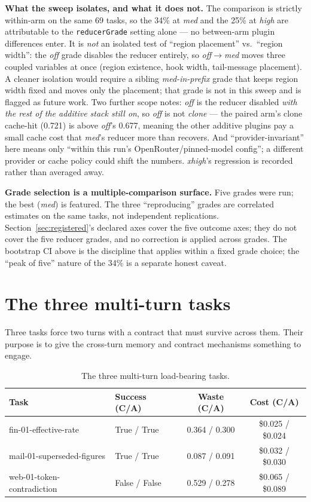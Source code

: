 \documentclass[11pt]{article}
\begin{document}
\textbf{What the sweep isolates, and what it does not.} The comparison is strictly within-arm on the same 69 tasks, so the 34\% at \emph{med} and the 25\% at \emph{high} are attributable to the \texttt{reducerGrade} setting alone --- no between-arm plugin differences enter. It is \emph{not} an isolated test of ``region placement'' vs.\ ``region width'': the \emph{off} grade disables the reducer entirely, so \emph{off}$\rightarrow$\emph{med} moves three coupled variables at once (region existence, hook width, tail-message placement). A cleaner isolation would require a sibling \emph{med-in-prefix} grade that keeps region width fixed and moves only the placement; that grade is not in this sweep and is flagged as future work. Two further scope notes: \emph{off} is the reducer disabled \emph{with the rest of the additive stack still on}, so \emph{off} is not \emph{clone} --- the paired arm's clone cache-hit (0.721) is above \emph{off}'s 0.677, meaning the other additive plugins pay a small cache cost that \emph{med}'s reducer more than recovers. And ``provider-invariant'' here means only ``within this run's OpenRouter/pinned-model config''; a different provider or cache policy could shift the numbers. \emph{xhigh}'s regression is recorded rather than averaged away.

\textbf{Grade selection is a multiple-comparison surface.} Five grades were run; the best (\emph{med}) is featured. The three ``reproducing'' grades are correlated estimates on the same tasks, not independent replications. Section~\ref{sec:registered}'s declared axes cover the five outcome axes; they do not cover the five reducer grades, and no correction is applied across grades. The bootstrap CI above is the discipline that applies within a fixed grade choice; the ``peak of five'' nature of the 34\% is a separate honest caveat.

\section{The three multi-turn tasks}
\label{sec:multiturn}

Three tasks force two turns with a contract that must survive across them. Their purpose is to give the cross-turn memory and contract mechanisms something to engage.

\begin{table}[h]
\centering
\begin{tabular}{@{}llcc@{}}
\toprule
Task & Success (C/A) & Waste (C/A) & Cost (C/A) \\
\midrule
fin-01-effective-rate & True / True & 0.364 / 0.300 & \$0.025 / \$0.024 \\
mail-01-superseded-figures & True / True & 0.087 / 0.091 & \$0.032 / \$0.030 \\
web-01-token-contradiction & False / False & 0.529 / 0.278 & \$0.065 / \$0.089 \\
\bottomrule
\end{tabular}
\caption{The three multi-turn load-bearing tasks.}
\label{tab:multiturn}
\end{table}
\end{document}
